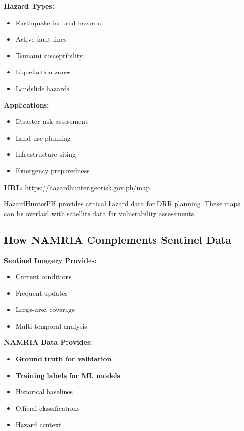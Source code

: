 \documentclass[
  letterpaper,
  DIV=11,
  numbers=noendperiod]{scrartcl}
\providecommand{\tightlist}{%
  \setlength{\itemsep}{0pt}\setlength{\parskip}{0pt}}
\begin{document}
\textbf{Hazard Types:}

\begin{itemize}
\tightlist
\item
  Earthquake-induced hazards
\item
  Active fault lines
\item
  Tsunami susceptibility
\item
  Liquefaction zones
\item
  Landslide hazards
\end{itemize}

\textbf{Applications:}

\begin{itemize}
\tightlist
\item
  Disaster risk assessment
\item
  Land use planning
\item
  Infrastructure siting
\item
  Emergency preparedness
\end{itemize}

\textbf{URL:} \url{https://hazardhunter.georisk.gov.ph/map}

HazardHunterPH provides critical hazard data for DRR planning. These
maps can be overlaid with satellite data for vulnerability assessments.

\subsection{How NAMRIA Complements Sentinel
Data}\label{how-namria-complements-sentinel-data}

\textbf{Sentinel Imagery Provides:}

\begin{itemize}
\tightlist
\item
  Current conditions
\item
  Frequent updates
\item
  Large-area coverage
\item
  Multi-temporal analysis
\end{itemize}

\textbf{NAMRIA Data Provides:}

\begin{itemize}
\tightlist
\item
  \textbf{Ground truth for validation}
\item
  \textbf{Training labels for ML models}
\item
  Historical baselines
\item
  Official classifications
\item
  Hazard context
\end{itemize}
\end{document}
